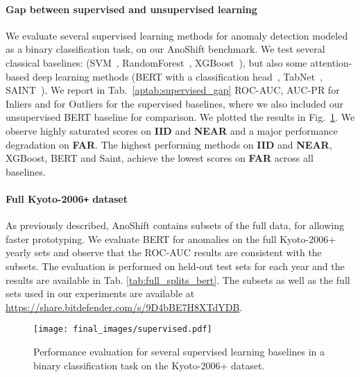 \documentclass{article}
\begin{document}
\paragraph{Gap between supervised and unsupervised learning} We evaluate several supervised learning methods for anomaly detection modeled as a binary classification task, on our AnoShift benchmark. We test several classical baselines: (SVM~\cite{cortes1995support}, RandomForest~\cite{liaw2002classification}, XGBoost~\cite{chen2015xgboost}), but also some attention-based deep learning methods (BERT with a classification head~\cite{devlin2018bert}, TabNet~\cite{arik2021tabnet}, SAINT~\cite{somepalli2021saint}). We report in Tab.~\ref{aptab:supervised_gap} ROC-AUC, AUC-PR for Inliers and for Outliers for the supervised baselines, where we also included our unsupervised BERT baseline for comparison. We plotted the results in Fig.~\ref{fig:supervised}. We observe highly saturated scores on \textbf{IID} and \textbf{NEAR} and a major performance degradation on \textbf{FAR}. The highest performing methods on \textbf{IID} and \textbf{NEAR}, XGBoost, BERT and Saint, achieve the lowest scores on \textbf{FAR} across all baselines.

\paragraph{Full Kyoto-2006\texttt{+} dataset} As previously described, AnoShift contains subsets of the full data, for allowing faster prototyping. We evaluate BERT for anomalies on the full Kyoto-2006+ yearly sets and observe that the ROC-AUC results are consistent with the subsets. The evaluation is performed on held-out test sets for each year and the results are available in Tab. \ref{tab:full_splits_bert}. The subsets as well as the full sets used in our experiments are available at \url{https://share.bitdefender.com/s/9D4bBE7H8XTdYDB}.


















\begin{figure}[t]
    \begin{center}
        \texttt{[image: final\_images/supervised.pdf]}
    \end{center}
    \caption{Performance evaluation for several supervised learning baselines in a binary classification task on the Kyoto-2006+ dataset.}
    \label{fig:supervised}
\end{figure}
\end{document}
